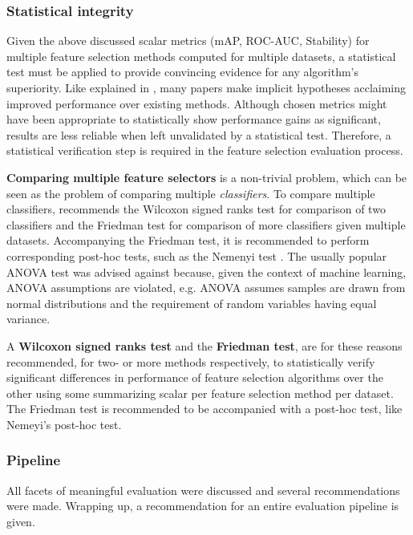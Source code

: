 \documentclass{article}
\begin{document}
\subsubsection{Statistical integrity}\label{sec:evaluation-statistical-integrity}
Given the above discussed scalar metrics (mAP, ROC-AUC, Stability) for multiple feature selection methods computed for multiple datasets, a statistical test must be applied to provide convincing evidence for any algorithm's superiority. Like explained in \citep{demvsar2006statistical}, many papers make implicit hypotheses acclaiming improved performance over existing methods. Although chosen metrics might have been appropriate to statistically show performance gains as significant, results are less reliable when left unvalidated by a statistical test. Therefore, a statistical verification step is required in the feature selection evaluation process.

\textbf{Comparing multiple feature selectors} is a non-trivial problem, which can be seen as the problem of comparing multiple \textit{classifiers}. To compare multiple classifiers, \citep{demvsar2006statistical} recommends the Wilcoxon signed ranks test for comparison of two classifiers and the Friedman test for comparison of more classifiers given multiple datasets. Accompanying the Friedman test, it is recommended to perform corresponding post-hoc tests, such as the Nemenyi test \citep{nemenyi1963distribution}. The usually popular ANOVA test was advised against because, given the context of machine learning, ANOVA assumptions are violated, e.g. ANOVA assumes samples are drawn from normal distributions and the requirement of random variables having equal variance.

A \textbf{Wilcoxon signed ranks test} and the \textbf{Friedman test}, are for these reasons recommended, for two- or more methods respectively, to statistically verify significant differences in performance of feature selection algorithms over the other using some summarizing scalar per feature selection method per dataset. The Friedman test is recommended to be accompanied with a post-hoc test, like Nemeyi's post-hoc test.

\subsubsection{Pipeline}
All facets of meaningful evaluation were discussed and several recommendations were made. Wrapping up, a recommendation for an entire evaluation pipeline is given.
\end{document}
